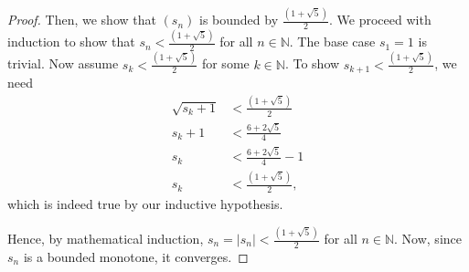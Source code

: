 \documentclass{article}
\begin{document}
\begin{enumerate}[label=(\alph*)]
\begin{proof}
        Then, we show that $(s_n)$ is bounded by $\frac{\left(1+\sqrt{5}\right)}{2}$. We proceed 
        with induction to show that $s_n < \frac{\left(1+\sqrt{5}\right)}{2}$ for all 
        $n\in\mathbb{N}$. The base case $s_1 = 1$ is trivial. Now assume 
        $s_k < \frac{\left(1+\sqrt{5}\right)}{2}$ for some $k\in\mathbb{N}$.
        To show $s_{k+1} < \frac{\left(1+\sqrt{5}\right)}{2}$, we need
        \begin{align*}
            \sqrt{s_k+1} & < \frac{\left(1+\sqrt{5}\right)}{2} \\ 
            s_k + 1 & < \frac{6 + 2\sqrt{5}}{4} \\
            s_k & < \frac{6 + 2\sqrt{5}}{4} - 1 \\ 
            s_k & < \frac{\left(1+\sqrt{5}\right)}{2},
        \end{align*}
        which is indeed true by our inductive hypothesis.

        Hence, by mathematical induction, $s_n = |s_n| < \frac{\left(1+\sqrt{5}\right)}{2}$ for all 
        $n\in\mathbb{N}$. Now, since $s_n$ is a bounded monotone, it converges.
    \end{proof}
\end{enumerate}
\end{document}
